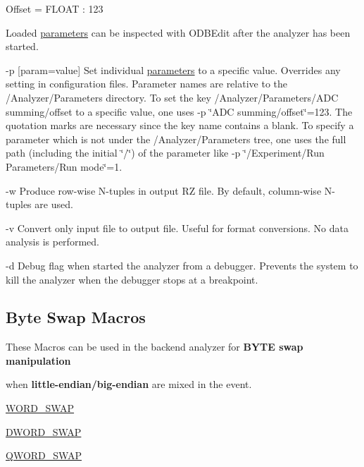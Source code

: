 \begin{DoxyItemize}
\begin{DoxyCode}
Offset = FLOAT : 123
\end{DoxyCode}
 Loaded \hyperlink{structparameters}{parameters} can be inspected with ODBEdit after the analyzer has been started.
\item -\/p \mbox{[}param=value\mbox{]} Set individual \hyperlink{structparameters}{parameters} to a specific value. Overrides any setting in configuration files. Parameter names are relative to the /Analyzer/Parameters directory. To set the key /Analyzer/Parameters/ADC summing/offset to a specific value, one uses -\/p \char`\"{}ADC summing/offset\char`\"{}=123. The quotation marks are necessary since the key name contains a blank. To specify a parameter which is not under the /Analyzer/Parameters tree, one uses the full path (including the initial \char`\"{}/\char`\"{}) of the parameter like -\/p \char`\"{}/Experiment/Run Parameters/Run mode\char`\"{}=1.
\item -\/w Produce row-\/wise N-\/tuples in output RZ file. By default, column-\/wise N-\/tuples are used.
\item -\/v Convert only input file to output file. Useful for format conversions. No data analysis is performed.
\item -\/d Debug flag when started the analyzer from a debugger. Prevents the system to kill the analyzer when the debugger stops at a breakpoint.
\end{DoxyItemize}

\par


\par
\hypertarget{DataAnalysis_DA_Byte_Swap_Macros}{}\subsection{Byte Swap Macros}\label{DataAnalysis_DA_Byte_Swap_Macros}
These Macros can be used in the backend analyzer for {\bfseries BYTE swap manipulation}

when {\bfseries  little-\/endian/big-\/endian } are mixed in the event.
\begin{DoxyItemize}
\item \hyperlink{group__msmacroh_ga4670ac841b4b8e3c3141a91a743bc61d}{WORD\_\-SWAP}
\item \hyperlink{group__msmacroh_gadb40ea04e4e009bbde68c027a8f95039}{DWORD\_\-SWAP}
\item \hyperlink{group__msmacroh_ga8c6db33e3f8af89e87556d9f7a9b32a8}{QWORD\_\-SWAP}
\end{DoxyItemize}

\label{index_end}
\hypertarget{index_end}{}


\par
  